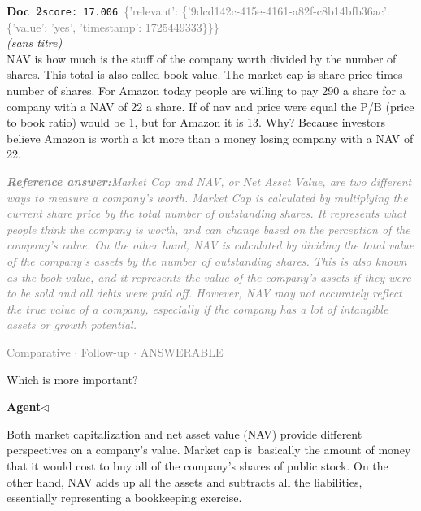 \documentclass[a4paper,11pt]{article}
\begin{document}
\begin{docenv}
{\footnotesize\textcolor{doccolor}{\textbf{Doc~2}}}\hfill{\tiny\texttt{score:~17.006}}\ {\tiny\textcolor{gray}{\{'relevant': \{'9dcd142c-415e-4161-a82f-c8b14bfb36ac': \{'value': 'yes', 'timestamp': 1725449333\}\}\}}}\\[3pt]
{\small\textit{(sans titre)}}\\[2pt]
\vspace{2pt}
{\footnotesize 
NAV is  how much is the stuff of the company worth divided by the number of shares. This total is also called book value. The market cap is share price times number of shares. For Amazon  today people are willing to pay 290 a share for a company with a NAV of 22 a share. If of nav and price were equal the P/B (price to book ratio) would be 1, but for Amazon it is 13.  Why? Because investors believe Amazon is worth a lot more than a money losing company with a NAV of 22.}
\end{docenv}
\begin{refanswerenv}
{\footnotesize\textit{\textcolor{gray}{\textbf{Reference answer:}\enspace Market Cap and NAV, or Net Asset Value, are two different ways to measure a company's worth. Market Cap is calculated by multiplying the current share price by the total number of outstanding shares. It represents what people think the company is worth, and can change based on the perception of the company's value. On the other hand, NAV is calculated by dividing the total value of the company's assets by the number of outstanding shares. This is also known as the book value, and it represents the value of the company's assets if they were to be sold and all debts were paid off. However, NAV may not accurately reflect the true value of a company, especially if the company has a lot of intangible assets or growth potential.}}}
\end{refanswerenv}
\vspace{0.5em}
\hfill{\tiny\textcolor{gray}{Comparative $\cdot$ Follow-up $\cdot$ ANSWERABLE}}
\begin{userbubble}
Which is more important?
\end{userbubble}
\noindent\hfill{\small\textcolor{agentcolor}{\textbf{Agent\enspace$\triangleleft$}}}
\begin{agentbubble}
Both market capitalization and net asset value (NAV) provide different perspectives on a company's value. Market cap is basically the amount of money that it would cost to buy all of the company's shares of public stock. On the other hand, NAV adds up all the assets and subtracts all the liabilities, essentially representing a bookkeeping exercise.
\end{agentbubble}
\end{document}
